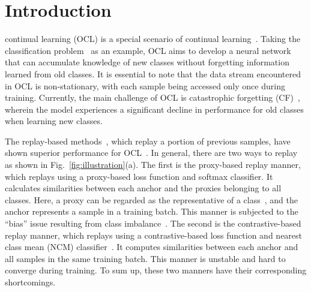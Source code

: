 \ifCLASSOPTIONcompsoc
{}
\else
\section{Introduction}
\label{sec:introduction}
\fi


 continual learning (OCL) is a special scenario of continual learning~\cite{wang2024comprehensive}. Taking the classification problem~\cite{liu2022model} as an example, OCL aims to develop a neural network that can accumulate knowledge of new classes without forgetting information learned from old classes. It is essential to note that the data stream encountered in OCL is non-stationary, with each sample being accessed only once during training. Currently, the main challenge of OCL is catastrophic forgetting (CF)~\cite{kong2023overcoming}, wherein the model experiences a significant decline in performance for old classes when learning new classes\cite{zhao2021memory}. 


The replay-based methods~\cite{lin2022anchor}, which replay a portion of previous samples, have shown superior performance for OCL~\cite{mai2022online}. In general, there are two ways to replay as shown in Fig.~\ref{fig:illustration}(a). The first is the proxy-based replay manner, which replays using a proxy-based loss function and softmax classifier. It calculates similarities between each anchor and the proxies belonging to all classes. Here, a proxy can be regarded as the representative of a class~\cite{yao2022pcl}, and the anchor represents a sample in a training batch. This manner is subjected to the ``bias'' issue resulting from class imbalance~\cite{lin2022anchor}. The second is the contrastive-based replay manner, which replays using a contrastive-based loss function and nearest class mean (NCM) classifier~\cite{mensink2013distance}. It computes similarities between each anchor and all samples in the same training batch. This manner is unstable and hard to converge during training. To sum up, these two manners have their corresponding shortcomings.  

